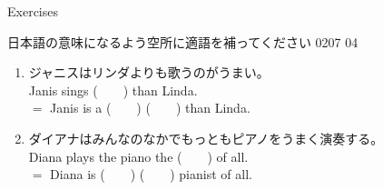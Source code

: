 \documentclass[aspectratio=169,xcolor={dvipsnames,table}]{beamer}
\begin{document}
\begin{frame}[plain,t]{Exercises}

{\small 日本語の意味になるよう空所に適語を補ってください}%
\hfill{\tiny 0207}\,{\scriptsize {}\,04}
\begin{enumerate}
 \item ジャニスはリンダよりも歌うのがうまい。\\
       Janis sings (~~~~) than Linda.\\
       $=$\,\,Janis is a  (~~~~)  (~~~~) than Linda.
 \item ダイアナはみんなのなかでもっともピアノをうまく演奏する。\\
       Diana plays the piano the (~~~~) of all.\\
       $=$\,\,Diana is (~~~~)  (~~~~) pianist of all.
\end{enumerate}

\bigskip
\bigskip


\end{frame}
\end{document}
